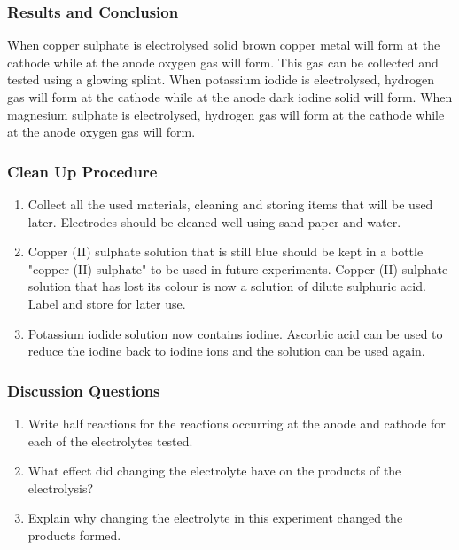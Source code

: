 \subsubsection*{Results and Conclusion}
When copper sulphate is electrolysed solid brown copper metal will form at the cathode while at the anode oxygen gas will form. This gas can be collected and tested using a glowing splint.
When potassium iodide is electrolysed, hydrogen gas will form at the cathode while at the anode dark iodine solid will form.
When magnesium sulphate is electrolysed, hydrogen gas will form at the cathode while at the anode oxygen gas will form.

\subsubsection*{Clean Up Procedure}
\begin{enumerate}
\item{Collect all the used materials, cleaning and storing items that will be used later. Electrodes should be cleaned well using sand paper and water.}
\item{Copper (II) sulphate solution that is still blue should be kept in a bottle "copper (II) sulphate" to be used in future experiments. Copper (II) sulphate solution that has lost its colour is now a solution of dilute sulphuric acid. Label and store for later use.}
\item{Potassium iodide solution now contains iodine. Ascorbic acid can be used to reduce the iodine back to iodine ions and the solution can be used again.}
\end{enumerate}

\subsubsection*{Discussion Questions}
\begin{enumerate}
\item{Write half reactions for the reactions occurring at the anode and cathode for each of the electrolytes tested.}
\item{What effect did changing the electrolyte have on the products of the electrolysis?}
\item{Explain why changing the electrolyte in this experiment changed the products formed.}
\end{enumerate}

